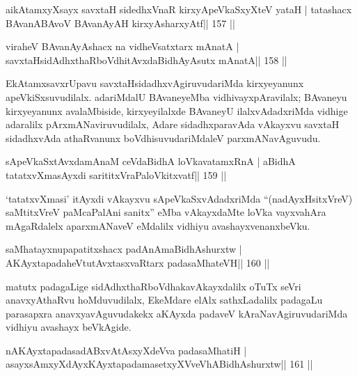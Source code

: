 
\begin{shl}
aikAtamxyXsayx savxtaH sidedhxVnaR kirxyA\s peVkaSxyXteV yataH |
tatashacx BAvanABAvoV BAvanAyAH kirxyAsharxyAtf\hfill || 157 ||
\end{shl}

\begin{shl}
viraheV BAvanAyAshacx na vidheVsatxtarx mAnatA |
savxtaHsidAdhxthaRboVdhitAvxdaBidhAyAsutx mAnatA\hfill || 158 ||
\end{shl}

\begin{artha}
EkAtamxsavxrUpavu savxtaHsidadhxvAgiruvudariMda kirxyeyanunx apeVkiSxsuvudilalx. ada\-riMdalU BAvaneyeMba vidhivayxpAravilalx; BAvaneyu kirxyeyanunx avalaMbiside, kirxyeyilalxde BAvaneyU ilalxvAdadxriMda vidhige adaralilx pArxmANaviruvudilalx, Adare sidadhxparavAda vAkayxvu savxtaH sidadhxvAda athaRvanunx boVdhisuvudariMdaleV parxmANavAguvudu.
\end{artha}


\begin{shl}
sApeVkaSxtAvxdamAnaM ceVdaBidhA loVkavatamxRnA |
aBidhA tatatxvXmasAyxdi sarititxVraPaloVkitxvatf\hfill || 159 ||
\end{shl}

\begin{artha}
`tatatxvXmasi' itAyxdi vAkayxvu sApeVkaSxvAdadxriMda ``(nadAyxHsitxVreV) saMtitxVreV paMcaPalAni sanitx'' eMba vAkayxdaMte loVka vayxvahAra mAgaRdalelx aparxmANaveV eMdalilx vidhiyu avashayxvenanxbeVku.
\end{artha}

\begin{shl}
saMhatayxnupapatitxshacx padAnAmaBidhAshurxtw |
AKAyxtapadaheVtutAvxtasxvaRtarx padasaMhateVH\hfill || 160 ||
\end{shl}

\begin{artha}
matutx padagaLige sidAdhxthaRboVdhakavAkayxdalilx oTuTx seVri anavxyAthaRvu hoMduvudilalx, EkeMdare elAlx sathxLadalilx padagaLu parasapxra anavxyavAguvudakekx aKAyxda padaveV kAraNavAgiruvudariMda vidhiyu avashayx beVkAgide.
\end{artha}


\begin{shl}
nA\s\s KAyxtapadasadABxvAtAsxyXdeVva padasaMhatiH |
asayxsAmxyXdAyxKAyxtapadamasetxyXVveVhABidhAshurxtw\hfill || 161 ||
\end{shl}

